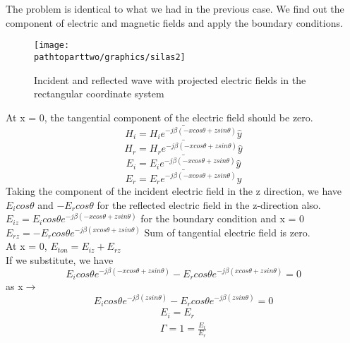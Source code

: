 The problem is identical to what we had in the previous case. We find out the component of electric and magnetic fields and apply the boundary conditions.
\begin{figure}[h]
\centering
\texttt{[image: \\pathtoparttwo/graphics/silas2]}
\caption{Incident and reflected wave with projected electric fields in the rectangular coordinate system}
\label{fig:silas2}
\end{figure}
At x = 0, the tangential component of the electric field should be zero.
\begin{equation*}
\bar{H_{i} = H_{i} e^{-j\beta(-xcos\theta + zsin\theta)} \hat{y}}
\end{equation*}
\begin{equation*}
\bar{H_{r} = H_{r} e^{-j\beta(-xcos\theta + zsin\theta)} \hat{y}}
\end{equation*}
\begin{equation*}
\bar{E_{i} = E_{i} e^{-j\beta(-xcos\theta + zsin\theta)} \hat{y}}
\end{equation*}
\begin{equation*}
\bar{E_{r} = E_{r} e^{-j\beta(-xcos\theta + zsin\theta)} \hat{y}}
\end{equation*}
Taking the component of the incident electric field in the z direction, we have $E_{i} cos\theta$ and $-E_{r}cos\theta$ for the reflected electric field in the z-direction also.\\
$E_{iz} = E_{i}cos\theta e^{-j\beta(-xcos\theta + zsin\theta)}$	for the boundary condition and x = 0\\
$E_{rz} = -E_{r}cos\theta e^{-j\beta(xcos\theta + zsin\theta)}$   Sum of tangential electric field is zero.\\
At x = 0, $E_{ton} = E_{iz} + E_{rz}$\\
If we substitute, we have\\
\begin{equation*}
E_{i}cos\theta e^{-j\beta(-xcos\theta + zsin\theta)} - E_{r}cos\theta e^{-j\beta(xcos\theta + zsin\theta)} = 0
\end{equation*}
as x$\rightarrow$
\begin{equation*}
E_{i}cos\theta e^{-j\beta(zsin\theta)} - E_{r}cos\theta e^{-j\beta(zsin\theta)} = 0
\end{equation*}
\begin{align*}
E_{i} = E_{r}\\
\Gamma= 1 = \frac{E_{i}}{E_{r}}
\end{align*}
